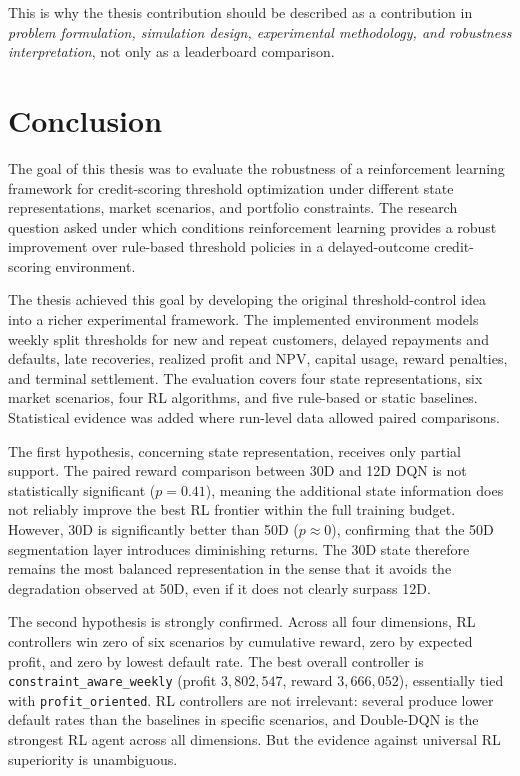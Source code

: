 \documentclass[12pt,a4paper]{article}
\begin{document}
This is why the thesis contribution should be described as a contribution in \emph{problem formulation, simulation design, experimental methodology, and robustness interpretation}, not only as a leaderboard comparison.

\section{Conclusion}

The goal of this thesis was to evaluate the robustness of a reinforcement learning framework for credit-scoring threshold optimization under different state representations, market scenarios, and portfolio constraints. The research question asked under which conditions reinforcement learning provides a robust improvement over rule-based threshold policies in a delayed-outcome credit-scoring environment.

The thesis achieved this goal by developing the original threshold-control idea into a richer experimental framework. The implemented environment models weekly split thresholds for new and repeat customers, delayed repayments and defaults, late recoveries, realized profit and NPV, capital usage, reward penalties, and terminal settlement. The evaluation covers four state representations, six market scenarios, four RL algorithms, and five rule-based or static baselines. Statistical evidence was added where run-level data allowed paired comparisons.

The first hypothesis, concerning state representation, receives only partial support. The paired reward comparison between 30D and 12D DQN is not statistically significant ($p = 0.41$), meaning the additional state information does not reliably improve the best RL frontier within the full training budget. However, 30D is significantly better than 50D ($p \approx 0$), confirming that the 50D segmentation layer introduces diminishing returns. The 30D state therefore remains the most balanced representation in the sense that it avoids the degradation observed at 50D, even if it does not clearly surpass 12D.

The second hypothesis is strongly confirmed. Across all four dimensions, RL controllers win zero of six scenarios by cumulative reward, zero by expected profit, and zero by lowest default rate. The best overall controller is \texttt{constraint\_aware\_weekly} (profit $3{,}802{,}547$, reward $3{,}666{,}052$), essentially tied with \texttt{profit\_oriented}. RL controllers are not irrelevant: several produce lower default rates than the baselines in specific scenarios, and Double-DQN is the strongest RL agent across all dimensions. But the evidence against universal RL superiority is unambiguous.
\end{document}

